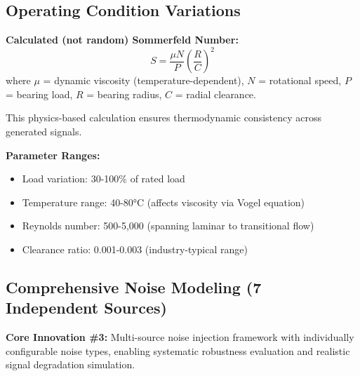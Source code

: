 \documentclass[11pt,a4paper]{article}
\begin{document}
\subsection{Operating Condition Variations}

\textbf{Calculated (not random) Sommerfeld Number:}
\begin{equation}
S = \frac{\mu N}{P} \left(\frac{R}{C}\right)^2
\end{equation}
where $\mu$ = dynamic viscosity (temperature-dependent), $N$ = rotational speed, $P$ = bearing load, $R$ = bearing radius, $C$ = radial clearance.

This physics-based calculation ensures thermodynamic consistency across generated signals.

\textbf{Parameter Ranges:}
\begin{itemize}[itemsep=0.2em]
    \item Load variation: 30-100\% of rated load
    \item Temperature range: 40-80°C (affects viscosity via Vogel equation)
    \item Reynolds number: 500-5,000 (spanning laminar to transitional flow)
    \item Clearance ratio: 0.001-0.003 (industry-typical range)
\end{itemize}

\subsection{Comprehensive Noise Modeling (7 Independent Sources)}

\begin{innovation}
\textbf{Core Innovation \#3:} Multi-source noise injection framework with individually configurable noise types, enabling systematic robustness evaluation and realistic signal degradation simulation.
\end{innovation}
\end{document}
